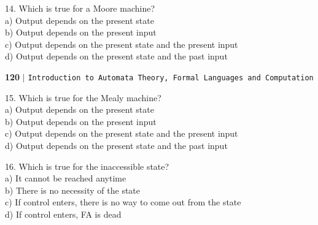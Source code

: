 \vspace*{0.2cm}

14. Which is true for a Moore machine?\\
\hspace*{0.5cm} a) Output depends on the present state \\
\hspace*{0.5cm} b) Output depends on the present input \\
\hspace*{0.5cm} c) Output depends on the present state and the present input \\
\hspace*{0.5cm} d) Output depends on the present state and the past input \\

\begin{flushleft}
	\textbf{120}\hspace*{0.1cm} \textbf{$|$} \hspace*{0.1cm} \texttt{Introduction to Automata Theory, Formal Languages and Computation}
\end{flushleft}

\vspace*{0.3cm}
15. Which is true for the Mealy machine?\\
\hspace*{0.5cm} a) Output depends on the present state \\
\hspace*{0.5cm} b) Output depends on the present input \\
\hspace*{0.5cm} c) Output depends on the present state and the present input\\
\hspace*{0.5cm} d) Output depends on the present state and the past input\\

\vspace*{0.2cm}

16. Which is true for the inaccessible state?\\
\hspace*{0.5cm} a) It cannot be reached anytime \\
\hspace*{0.5cm} b) There is no necessity of the state \\
\hspace*{0.5cm} c) If control enters, there is no way to come out from the state \\
\hspace*{0.5cm} d) If control enters, FA is dead \\

